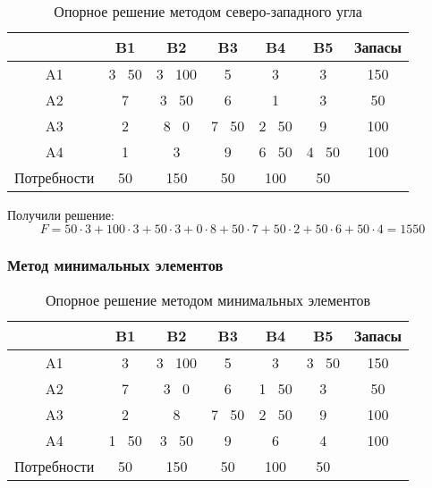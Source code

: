 \documentclass[17pt]{extarticle}
\begin{document}
\begin{table}[h!]
    \centering
    \begin{tabular}{c|ccccc|c}
        \toprule
                    & B1     & B2      & B3     & B4     & B5     & Запасы \\
        \midrule
        A1          & 3 \ 50 & 3 \ 100 & 5      & 3      & 3      & 150    \\
        A2          & 7      & 3 \ 50  & 6      & 1      & 3      & 50     \\
        A3          & 2      & 8 \ 0   & 7 \ 50 & 2 \ 50 & 9      & 100    \\
        A4          & 1      & 3       & 9      & 6 \ 50 & 4 \ 50 & 100    \\
        \midrule
        Потребности & 50     & 150     & 50     & 100    & 50     &        \\
        \bottomrule
    \end{tabular}
    \caption{Опорное решение методом северо-западного угла}
\end{table}

Получили решение:
\[
    F = 50 \cdot 3 + 100 \cdot 3 + 50 \cdot 3 + 0 \cdot 8 + 50 \cdot 7 + 50 \cdot 2 + 50 \cdot 6 + 50 \cdot 4 = 1550
\]

\subsubsection*{Метод минимальных элементов}

\begin{table}[h!]
    \centering
    \begin{tabular}{c|ccccc|c}
        \toprule
                    & B1     & B2      & B3     & B4     & B5     & Запасы \\
        \midrule
        A1          & 3      & 3 \ 100 & 5      & 3      & 3 \ 50 & 150    \\
        A2          & 7      & 3 \ 0   & 6      & 1 \ 50 & 3      & 50     \\
        A3          & 2      & 8       & 7 \ 50 & 2 \ 50 & 9      & 100    \\
        A4          & 1 \ 50 & 3 \ 50  & 9      & 6      & 4      & 100    \\
        \midrule
        Потребности & 50     & 150     & 50     & 100    & 50     &        \\
        \bottomrule
    \end{tabular}
    \caption{Опорное решение методом минимальных элементов}
\end{table}
\end{document}
